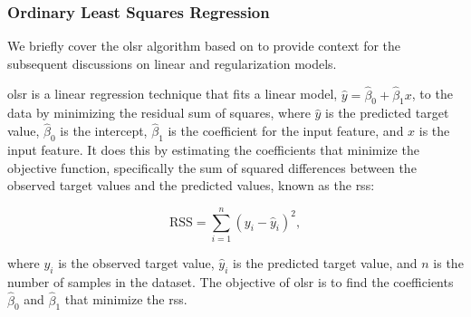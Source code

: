 \subsubsection{Ordinary Least Squares Regression}\label{sec:ols}
We briefly cover the \gls{olsr} algorithm based on \citet{James2023AnIS} to provide context for the subsequent discussions on linear and regularization models.

\gls{olsr} is a linear regression technique that fits a linear model, $\hat{y} = \hat{\beta}_0 + \hat{\beta}_1 x$, to the data by minimizing the residual sum of squares, where $\hat{y}$ is the predicted target value, $\hat{\beta}_0$ is the intercept, $\hat{\beta}_1$ is the coefficient for the input feature, and $x$ is the input feature.
It does this by estimating the coefficients that minimize the objective function, specifically the sum of squared differences between the observed target values and the predicted values, known as the \gls{rss}:

$$
\text{RSS} = \sum_{i=1}^{n} (y_i - \hat{y}_i)^2,
$$

where $y_i$ is the observed target value, $\hat{y}_i$ is the predicted target value, and $n$ is the number of samples in the dataset.
The objective of \gls{olsr} is to find the coefficients $\hat{\beta}_0$ and $\hat{\beta}_1$ that minimize the \gls{rss}.